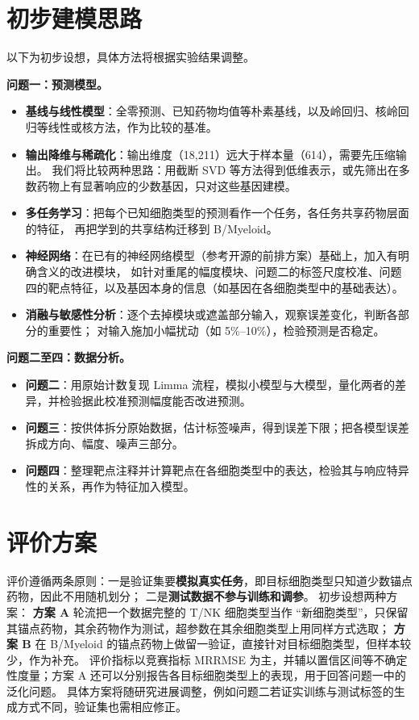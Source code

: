\documentclass[11pt,a4paper]{article}
\begin{document}
\section{初步建模思路}

以下为初步设想，具体方法将根据实验结果调整。

\textbf{问题一：预测模型。}
\begin{itemize}
\item \textbf{基线与线性模型}：全零预测、已知药物均值等朴素基线，以及岭回归、核岭回归等线性或核方法，作为比较的基准。
\item \textbf{输出降维与稀疏化}：输出维度（18{,}211）远大于样本量（614），需要先压缩输出。
  我们将比较两种思路：用截断 SVD 等方法得到低维表示，或先筛出在多数药物上有显著响应的少数基因，只对这些基因建模。
\item \textbf{多任务学习}：把每个已知细胞类型的预测看作一个任务，各任务共享药物层面的特征，
  再把学到的共享结构迁移到 B/Myeloid。
\item \textbf{神经网络}：在已有的神经网络模型（参考开源的前排方案）基础上，加入有明确含义的改进模块，
  如针对重尾的幅度模块、问题二的标签尺度校准、问题四的靶点特征，以及基因本身的信息（如基因在各细胞类型中的基础表达）。
\item \textbf{消融与敏感性分析}：逐个去掉模块或遮盖部分输入，观察误差变化，判断各部分的重要性；
  对输入施加小幅扰动（如 5\%--10\%），检验预测是否稳定。
\end{itemize}

\textbf{问题二至四：数据分析。}
\begin{itemize}
\item \textbf{问题二}：用原始计数复现 Limma 流程，模拟小模型与大模型，量化两者的差异，并检验据此校准预测幅度能否改进预测。
\item \textbf{问题三}：按供体拆分原始数据，估计标签噪声，得到误差下限；把各模型误差拆成方向、幅度、噪声三部分。
\item \textbf{问题四}：整理靶点注释并计算靶点在各细胞类型中的表达，检验其与响应特异性的关系，再作为特征加入模型。
\end{itemize}

\section{评价方案}

评价遵循两条原则：一是验证集要\textbf{模拟真实任务}，即目标细胞类型只知道少数锚点药物，因此不用随机划分；
二是\textbf{测试数据不参与训练和调参}。
初步设想两种方案：
\textbf{方案 A} 轮流把一个数据完整的 T/NK 细胞类型当作 ``新细胞类型''，只保留其锚点药物，其余药物作为测试，超参数在其余细胞类型上用同样方式选取；
\textbf{方案 B} 在 B/Myeloid 的锚点药物上做留一验证，直接针对目标细胞类型，但样本较少，作为补充。
评价指标以竞赛指标 MRRMSE 为主，并辅以置信区间等不确定性度量；方案 A 还可以分别报告各目标细胞类型上的表现，用于回答问题一中的泛化问题。
具体方案将随研究进展调整，例如问题二若证实训练与测试标签的生成方式不同，验证集也需相应修正。
\end{document}
